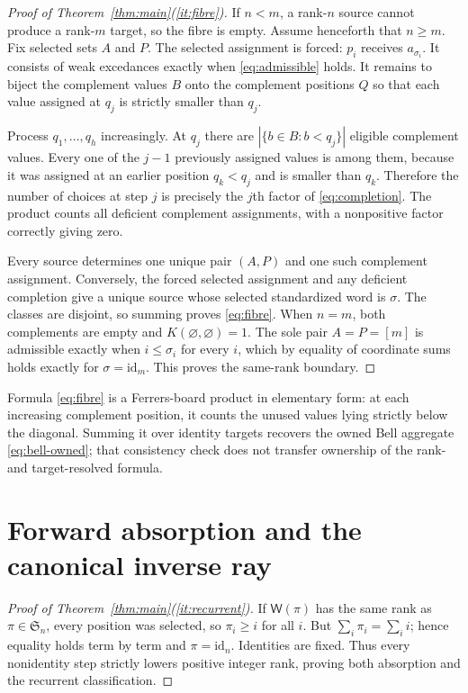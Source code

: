 \documentclass[a4paper,10pt]{amsart}
\theoremstyle{remark}
\newcommand{\Sym}{\mathfrak S}
\newcommand{\WEX}{\mathsf W}
\begin{document}
\begin{proof}[Proof of Theorem~\ref{thm:main}(\ref{it:fibre})]
If \(n<m\), a rank-\(n\) source cannot produce a rank-\(m\) target, so the
fibre is empty.  Assume henceforth that \(n\ge m\).
Fix selected sets $A$ and $P$.  The selected assignment is forced:
$p_i$ receives $a_{\sigma_i}$.  It consists of weak excedances exactly when
\eqref{eq:admissible} holds.  It remains to biject the complement values $B$
onto the complement positions $Q$ so that each value assigned at $q_j$ is
strictly smaller than $q_j$.

Process $q_1,\ldots,q_h$ increasingly.  At $q_j$ there are
$|\{b\in B:b<q_j\}|$ eligible complement values.  Every one of the $j-1$
previously assigned values is among them, because it was assigned at an
earlier position $q_k<q_j$ and is smaller than $q_k$.  Therefore the number
of choices at step $j$ is precisely the $j$th factor of
\eqref{eq:completion}.  The product counts all deficient complement
assignments, with a nonpositive factor correctly giving zero.

Every source determines one unique pair $(A,P)$ and one such complement
assignment.  Conversely, the forced selected assignment and any deficient
completion give a unique source whose selected standardized word is
$\sigma$.  The classes are disjoint, so summing proves \eqref{eq:fibre}.
When \(n=m\), both complements are empty and
\(K(\varnothing,\varnothing)=1\).  The sole pair \(A=P=[m]\) is admissible
exactly when \(i\le\sigma_i\) for every \(i\), which by equality of coordinate
sums holds exactly for \(\sigma=\mathrm{id}_m\).  This proves the same-rank
boundary.
\end{proof}

Formula \eqref{eq:fibre} is a Ferrers-board product in elementary form: at
each increasing complement position, it counts the unused values lying
strictly below the diagonal.  Summing it over identity targets recovers the
owned Bell aggregate \eqref{eq:bell-owned}; that consistency check does not
transfer ownership of the rank- and target-resolved formula.

\section{Forward absorption and the canonical inverse ray}\label{sec:dynamics}

\begin{proof}[Proof of Theorem~\ref{thm:main}(\ref{it:recurrent})]
If $\WEX(\pi)$ has the same rank as $\pi\in\Sym_n$, every position was
selected, so $\pi_i\ge i$ for all $i$.  But
$\sum_i\pi_i=\sum_i i$; hence equality holds term by term and
$\pi=\mathrm{id}_n$.  Identities are fixed.  Thus every nonidentity step
strictly lowers positive integer rank, proving both absorption and the
recurrent classification.
\end{proof}
\end{document}
